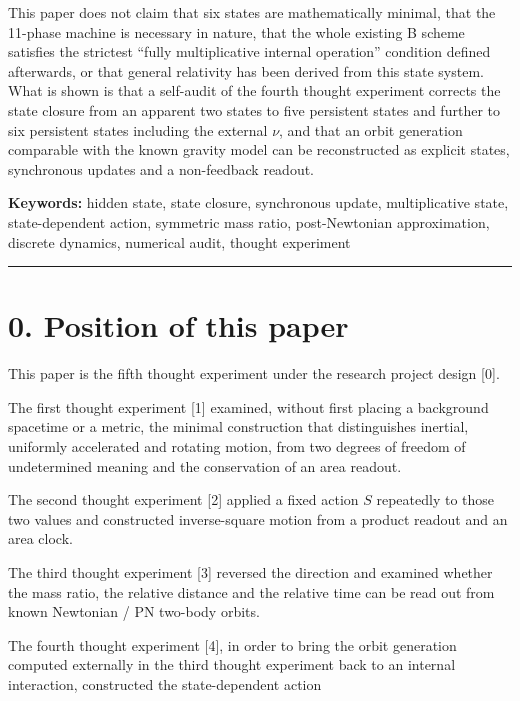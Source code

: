 \documentclass[
  a4paper,
]{article}
\begin{document}
This paper does not claim that six states are mathematically minimal,
that the 11-phase machine is necessary in nature, that the whole
existing B scheme satisfies the strictest ``fully multiplicative
internal operation'' condition defined afterwards, or that general
relativity has been derived from this state system. What is shown is
that a self-audit of the fourth thought experiment corrects the state
closure from an apparent two states to five persistent states and
further to six persistent states including the external \(\nu\), and
that an orbit generation comparable with the known gravity model can be
reconstructed as explicit states, synchronous updates and a non-feedback
readout.

\textbf{Keywords:} hidden state, state closure, synchronous update,
multiplicative state, state-dependent action, symmetric mass ratio,
post-Newtonian approximation, discrete dynamics, numerical audit,
thought experiment

\begin{center}\rule{0.5\linewidth}{0.5pt}\end{center}

\section{0. Position of this paper}\label{position-of-this-paper}

This paper is the fifth thought experiment under the research project
design {[}0{]}.

The first thought experiment {[}1{]} examined, without first placing a
background spacetime or a metric, the minimal construction that
distinguishes inertial, uniformly accelerated and rotating motion, from
two degrees of freedom of undetermined meaning and the conservation of
an area readout.

The second thought experiment {[}2{]} applied a fixed action \(S\)
repeatedly to those two values and constructed inverse-square motion
from a product readout and an area clock.

The third thought experiment {[}3{]} reversed the direction and examined
whether the mass ratio, the relative distance and the relative time can
be read out from known Newtonian / PN two-body orbits.

The fourth thought experiment {[}4{]}, in order to bring the orbit
generation computed externally in the third thought experiment back to
an internal interaction, constructed the state-dependent action
\end{document}
